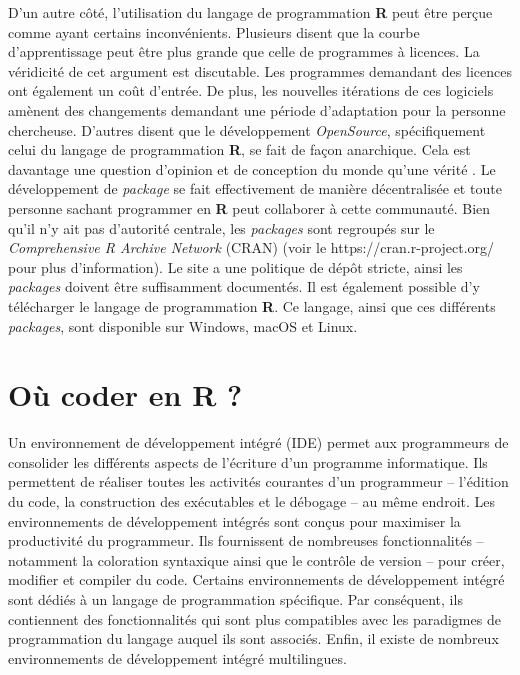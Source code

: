 \documentclass[
  letterpaper,
]{scrbook}
\begin{document}
D'un autre côté, l'utilisation du langage de programmation \textbf{R}
peut être perçue comme ayant certains inconvénients. Plusieurs disent
que la courbe d'apprentissage peut être plus grande que celle de
programmes à licences. La véridicité de cet argument est discutable. Les
programmes demandant des licences ont également un coût d'entrée. De
plus, les nouvelles itérations de ces logiciels amènent des changements
demandant une période d'adaptation pour la personne chercheuse. D'autres
disent que le développement \emph{OpenSource}, spécifiquement celui du
langage de programmation \textbf{R}, se fait de façon anarchique. Cela
est davantage une question d'opinion et de conception du monde qu'une
vérité . Le développement de \emph{package} se fait effectivement de
manière décentralisée et toute personne sachant programmer en \textbf{R}
peut collaborer à cette communauté. Bien qu'il n'y ait pas d'autorité
centrale, les \emph{packages} sont regroupés sur le \emph{Comprehensive
R Archive Network} (CRAN) (voir le https://cran.r-project.org/ pour plus
d'information). Le site a une politique de dépôt stricte, ainsi les
\emph{packages} doivent être suffisamment documentés. Il est également
possible d'y télécharger le langage de programmation \textbf{R}. Ce
langage, ainsi que ces différents \emph{packages}, sont disponible sur
Windows, macOS et Linux.

\hypertarget{ouxf9-coder-en-r}{%
\section{Où coder en R ?}\label{ouxf9-coder-en-r}}

Un environnement de développement intégré (IDE) permet aux programmeurs
de consolider les différents aspects de l'écriture d'un programme
informatique. Ils permettent de réaliser toutes les activités courantes
d'un programmeur -- l'édition du code, la construction des exécutables
et le débogage -- au même endroit. Les environnements de développement
intégrés sont conçus pour maximiser la productivité du programmeur. Ils
fournissent de nombreuses fonctionnalités -- notamment la coloration
syntaxique ainsi que le contrôle de version -- pour créer, modifier et
compiler du code. Certains environnements de développement intégré sont
dédiés à un langage de programmation spécifique. Par conséquent, ils
contiennent des fonctionnalités qui sont plus compatibles avec les
paradigmes de programmation du langage auquel ils sont associés. Enfin,
il existe de nombreux environnements de développement intégré
multilingues.
\end{document}
